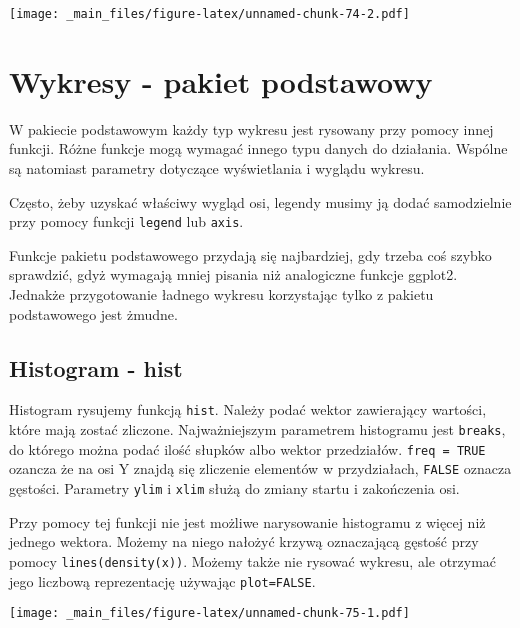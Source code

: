 \documentclass[
]{book}
\newenvironment{Shaded}{\begin{snugshade}}{\end{snugshade}}
\newcommand{\FunctionTok}[1]{\textcolor[rgb]{0.00,0.00,0.00}{#1}}
\newcommand{\NormalTok}[1]{#1}
\newcommand{\SpecialCharTok}[1]{\textcolor[rgb]{0.00,0.00,0.00}{#1}}
\begin{document}
\texttt{[image: \_main\_files/figure-latex/unnamed-chunk-74-2.pdf]}

\hypertarget{wykresy---pakiet-podstawowy}{%
\chapter{Wykresy - pakiet podstawowy}\label{wykresy---pakiet-podstawowy}}

W pakiecie podstawowym każdy typ wykresu jest rysowany przy pomocy innej funkcji. Różne funkcje mogą wymagać innego typu danych do działania. Wspólne są natomiast parametry dotyczące wyświetlania i wyglądu wykresu.

Często, żeby uzyskać właściwy wygląd osi, legendy musimy ją dodać samodzielnie przy pomocy funkcji \texttt{legend} lub \texttt{axis}.

Funkcje pakietu podstawowego przydają się najbardziej, gdy trzeba coś szybko sprawdzić, gdyż wymagają mniej pisania niż analogiczne funkcje ggplot2. Jednakże przygotowanie ładnego wykresu korzystając tylko z pakietu podstawowego jest żmudne.

\hypertarget{histogram---hist}{%
\section{Histogram - hist}\label{histogram---hist}}

Histogram rysujemy funkcją \texttt{hist}. Należy podać wektor zawierający wartości, które mają zostać zliczone. Najważniejszym parametrem histogramu jest \texttt{breaks}, do którego można podać ilość słupków albo wektor przedziałów. \texttt{freq\ =\ TRUE} ozancza że na osi Y znajdą się zliczenie elementów w przydziałach, \texttt{FALSE} oznacza gęstości. Parametry \texttt{ylim} i \texttt{xlim} służą do zmiany startu i zakończenia osi.

Przy pomocy tej funkcji nie jest możliwe narysowanie histogramu z więcej niż jednego wektora. Możemy na niego nałożyć krzywą oznaczającą gęstość przy pomocy \texttt{lines(density(x))}. Możemy także nie rysować wykresu, ale otrzymać jego liczbową reprezentację używając \texttt{plot=FALSE}.

\begin{Shaded}
\end{Shaded}

\texttt{[image: \_main\_files/figure-latex/unnamed-chunk-75-1.pdf]}
\end{document}
